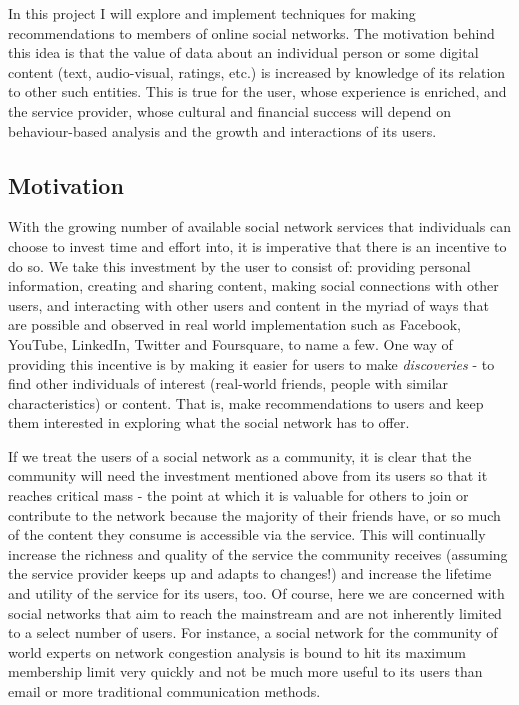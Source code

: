 In this project I will explore and implement techniques for making recommendations to members of online social networks. The motivation behind this idea is that the value of data about an individual person or some digital content (text, audio-visual, ratings, etc.) is increased by knowledge of its relation to other such entities. This is true for the user, whose experience is enriched, and the service provider, whose cultural and financial success will depend on behaviour-based analysis and the growth and interactions of its users.

\subsection*{Motivation}

With the growing number of available social network services that individuals can choose to invest time and effort into, it is imperative that there is an incentive to do so. We take this investment by the user to consist of: providing personal information, creating and sharing content, making social connections with other users, and interacting with other users and content in the myriad of ways that are possible and observed in real world implementation such as Facebook, YouTube, LinkedIn, Twitter and Foursquare, to name a few. One way of providing this incentive is by making it easier for users to make \emph{discoveries} - to find other individuals of interest (real-world friends, people with similar characteristics) or content. That is, make recommendations to users and keep them interested in exploring what the social network has to offer.

If we treat the users of a social network as a community, it is clear that the community will need the investment mentioned above from its users so that it reaches critical mass - the point at which it is valuable for others to join or contribute to the network because the majority of their friends have, or so much of the content they consume is accessible via the service. This will continually increase the richness and quality of the service the community receives (assuming the service provider keeps up and adapts to changes!) and increase the lifetime and utility of the service for its users, too. Of course, here we are concerned with social networks that aim to reach the mainstream and are not inherently limited to a select number of users. For instance, a social network for the community of world experts on network congestion analysis is bound to hit its maximum membership limit very quickly and not be much more useful to its users than email or more traditional communication methods.

